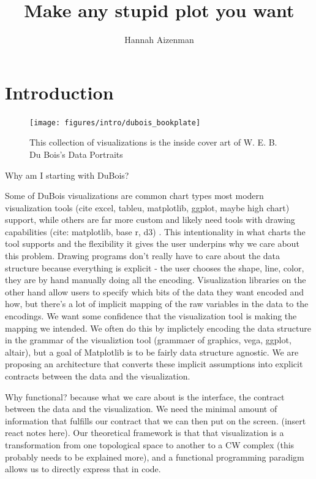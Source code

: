 \documentclass[letterpaper,onecolumn,titlepage]{Ythesis}
\title{Make any stupid plot you want}
\author{Hannah Aizenman}
\begin{document}
\makefrontmatter

\section{Introduction}
\label{sec:introduction}
\begin{figure}
    \texttt{[image: figures/intro/dubois\_bookplate]}
    \caption{This collection of visualizations is the inside cover art of W. E. B. Du Bois's Data Portraits\cite{duboiscenterattheuniversityofmassachusettsBoisDataPortraits2018}}
    \label{fig:dubois_bookplate}
\end{figure}

Why am I starting with DuBois? 

 Some of DuBois visualizations are common chart types most modern visualization tools (cite excel, tableu, matplotlib, ggplot, maybe high chart) support, while others are far more custom and likely need tools with drawing capabilities (cite: matplotlib, base r, d3) \cite{duboiscenterattheuniversityofmassachusettsBoisDataPortraits2018}. This intentionality in what charts the tool supports and the flexibility it gives the user underpins why we care about this problem. Drawing programs don't really have to care about the data structure because everything is explicit - the user chooses the shape, line, color, they are by hand manually doing all the encoding. Visualization libraries on the other hand allow users to specify which bits of the data they want encoded and how, but there's a lot of implicit mapping of the raw variables in the data to the encodings. We want some confidence that the visualization tool is making the mapping we intended. We often do this by implictely encoding the data structure in the grammar of the visualiztion tool (grammaer of graphics, vega, ggplot, altair), but a goal of Matplotlib \cite{huntermatplotlib2007} is to be fairly data structure agnostic. We are proposing an architecture that converts these implicit assumptions into explicit contracts between the data and the visualization. 

 Why functional?
 because what we care about is the interface, the contract between the data and the visualization. We need the minimal amount of information that fulfills our contract that we can then put on the screen. (insert react notes here). Our theoretical framework is that that visualization is a transformation from one topological space to another to a CW complex (this probably needs to be explained more), and a functional programming paradigm allows us to directly express that in code. 
\end{document}
